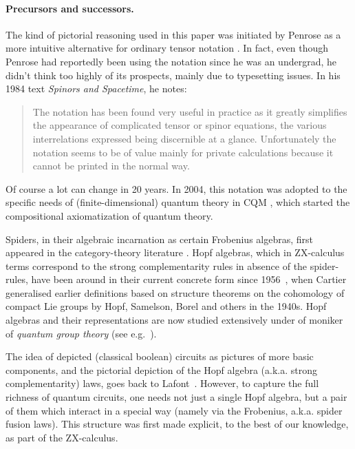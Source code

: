 \documentclass[11pt]{article}
\theoremstyle{definition}
\begin{document}
{\paragraph{Precursors and successors.} The kind of pictorial reasoning used in this paper was initiated by Penrose as a more intuitive alternative for ordinary tensor notation \cite{Penrose}. In fact, even though Penrose had reportedly been using the notation since he was an undergrad, he didn't think too highly of its prospects, mainly due to typesetting issues. In his 1984 text \textit{Spinors and Spacetime}, he notes:
\begin{quote}
The notation has been found very useful in practice as it greatly
simplifies the appearance of complicated tensor or spinor equations,
the various interrelations expressed being discernible at a glance.
Unfortunately the notation seems to be of value mainly for private
calculations because it cannot be printed in the normal way.
\end{quote}

Of course a lot can change in 20 years. In 2004, this notation was adopted to the specific needs of (finite-dimensional) quantum theory in CQM \cite{AC1}, which started the compositional axiomatization of quantum theory. 

Spiders, in their algebraic incarnation as certain Frobenius algebras, first appeared in the category-theory literature \cite{CarboniWalters, Lack}. Hopf algebras, which in ZX-calculus terms correspond to the strong complementarity rules in absence of the spider-rules,  have been around in their current concrete form since 1956~\cite{cartier2007primer}, when Cartier generalised earlier definitions based on structure theorems on the cohomology of compact Lie groups by Hopf, Samelson, Borel and others in the 1940s.   
Hopf algebras and their representations are now studied extensively under of moniker of \textit{quantum group theory} (see e.g.~\cite{majid2000foundations}).

The idea of depicted (classical boolean) circuits as pictures of more basic components, and the pictorial depiction of the Hopf algebra (a.k.a. strong complementarity) laws, goes back to Lafont~\cite{Lafont}. However, to capture the full richness of quantum circuits, one needs not just a single Hopf algebra, but a pair of them which interact in a special way (namely via the Frobenius, a.k.a. spider fusion laws). This structure was first made explicit, to the best of our knowledge, as part of the ZX-calculus.

}
\end{document}
